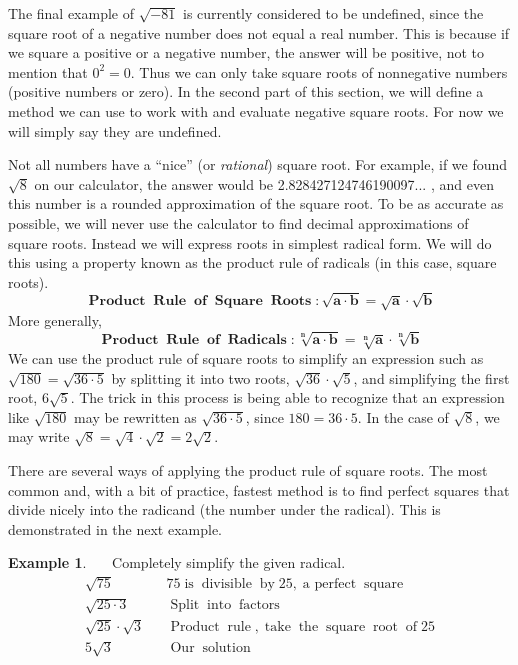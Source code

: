 \documentclass[12pt]{book}
\theoremstyle{definition}
\newtheorem{example}{Example}
\newcommand{\tmmathbf}[1]{\ensuremath{\boldsymbol{#1}}}
\newcommand{\tmop}[1]{\ensuremath{\operatorname{#1}}}
\begin{document}
The final example of $\sqrt{- 81}$ is currently considered to be undefined, since the square root of a negative number does not equal a real number. This is because if we square a positive or a negative number, the answer will be positive, not to mention that $0^2=0$. Thus we can only take square roots of nonnegative numbers (positive numbers or zero).  In the second part of this section, we will define a method we can use to work with and evaluate negative square roots.  For now we will simply say they are undefined.\par
Not all numbers have a ``nice'' (or \textit{rational}) square root. For example, if we found $\sqrt{8}$ on our calculator, the answer would be
2.828427124746190097...
, and even this number is a rounded approximation of the square root. To be as accurate as possible, we will never use the calculator to find decimal approximations of square roots. Instead we will express roots in simplest radical form. We will do this using a property known as the product rule of radicals (in this case, square roots).
\[ \tmmathbf{\tmop{Product} \tmop{Rule} \tmop{of} \tmop{Square} \tmop{Roots} :
   \sqrt{a \cdot b} = \sqrt{a} \cdot \sqrt{b}} \]
More generally,
\[ \tmmathbf{\tmop{Product} \tmop{Rule} \tmop{of} \tmop{Radicals} :
   \sqrt[n]{a \cdot b} = \sqrt[n]{a} \cdot \sqrt[n]{b}} \]
We can use the product rule of square roots to simplify an expression such as $\sqrt{180}=\sqrt{36 \cdot
5}$ by splitting it into two roots, $\sqrt{36} \cdot \sqrt{5}$, and simplifying the first root, $6 \sqrt{5}$. The trick in this process is being able to recognize that an expression like $\sqrt{180}$ may be rewritten as $\sqrt{36 \cdot 5}$, since $180=36\cdot 5$. In the case of $\sqrt{8}$, we may write $\sqrt{8}=\sqrt{4}\cdot\sqrt{2}=2\sqrt{2}$.\par
There are several ways of applying the product rule of square roots. The most common and, with a bit of practice, fastest method is to find perfect squares that divide nicely into the radicand (the number under the radical). This is demonstrated in the next example.
\begin{example}~~~Completely simplify the given radical.
  \begin{eqnarray*}
    \sqrt{75} &  & 75 \tmop{is} \tmop{divisible} \tmop{by} 25, 
    \tmop{a~perfect} \tmop{square}\\
    \sqrt{25 \cdot 3} &  & \tmop{Split} \tmop{into} \tmop{factors}\\
    \sqrt{25} \cdot \sqrt{3} &  & \tmop{Product} \tmop{rule}, \tmop{take}
    \tmop{the} \tmop{square} \tmop{root} \tmop{of} 25\\
    5 \sqrt{3} &  & \tmop{Our} \tmop{solution}
  \end{eqnarray*}
\end{example}
\end{document}
